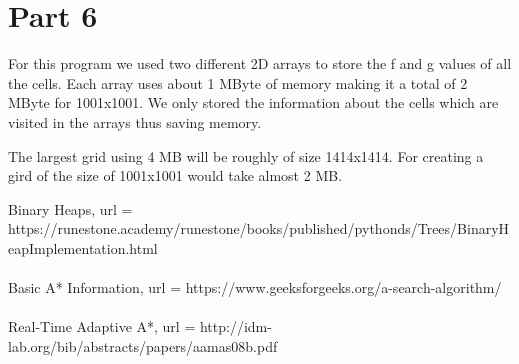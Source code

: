 \documentclass[a4paper, 12pt, one column]{article}
\begin{document}
\section*{Part 6}
    For this program we used two different 2D arrays to store the f and g values of all the cells. Each array uses about 1 MByte of memory making it a total of 2 MByte for 1001x1001. We only stored the information about the cells which are visited in the arrays thus saving memory.  \par The largest grid using 4 MB will be roughly of size 1414x1414. For creating a gird of the size of 1001x1001 would take almost 2 MB.
  
\newpage

  Binary Heaps,
  url = {https://runestone.academy/runestone/books/published/pythonds/Trees/BinaryHeapImplementation.html}
  \\
  \\
  Basic A* Information,
  url = {https://www.geeksforgeeks.org/a-search-algorithm/}
  \\
  \\
  Real-Time Adaptive A*,
  url = {http://idm-lab.org/bib/abstracts/papers/aamas08b.pdf}
  
  
  


      
\end{document}
